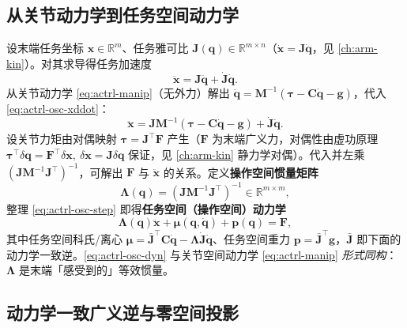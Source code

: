 \subsection{从关节动力学到任务空间动力学}
\label{sec:actrl-osc-deriv}

设末端任务坐标 $\mathbf{x}\in\mathbb{R}^m$、任务雅可比 $\mathbf{J}(\mathbf{q})\in\mathbb{R}^{m\times n}$（$\dot{\mathbf{x}}=\mathbf{J}\dot{\mathbf{q}}$，见 \cref{ch:arm-kin}）。对其求导得任务加速度
\begin{equation}
  \ddot{\mathbf{x}}=\mathbf{J}\ddot{\mathbf{q}}+\dot{\mathbf{J}}\dot{\mathbf{q}}.
  \label{eq:actrl-osc-xddot}
\end{equation}
从关节动力学 \cref{eq:actrl-manip}（无外力）解出 $\ddot{\mathbf{q}}=\mathbf{M}^{-1}(\boldsymbol{\tau}-\mathbf{C}\dot{\mathbf{q}}-\mathbf{g})$，代入 \cref{eq:actrl-osc-xddot}：
\begin{equation}
  \ddot{\mathbf{x}}=\mathbf{J}\mathbf{M}^{-1}(\boldsymbol{\tau}-\mathbf{C}\dot{\mathbf{q}}-\mathbf{g})+\dot{\mathbf{J}}\dot{\mathbf{q}}.
  \label{eq:actrl-osc-step}
\end{equation}
设关节力矩由对偶映射 $\boldsymbol{\tau}=\mathbf{J}^\top\mathbf{F}$ 产生（$\mathbf{F}$ 为末端广义力，对偶性由虚功原理 $\boldsymbol{\tau}^\top\delta\mathbf{q}=\mathbf{F}^\top\delta\mathbf{x},\ \delta\mathbf{x}=\mathbf{J}\delta\mathbf{q}$ 保证，见 \cref{ch:arm-kin} 静力学对偶）。代入并左乘 $(\mathbf{J}\mathbf{M}^{-1}\mathbf{J}^\top)^{-1}$，可解出 $\mathbf{F}$ 与 $\ddot{\mathbf{x}}$ 的关系。定义\textbf{操作空间惯量矩阵}
\begin{equation}
  \boxed{\boldsymbol{\Lambda}(\mathbf{q})=(\mathbf{J}\mathbf{M}^{-1}\mathbf{J}^\top)^{-1}\in\mathbb{R}^{m\times m},}
  \label{eq:actrl-Lambda}
\end{equation}
整理 \cref{eq:actrl-osc-step} 即得\textbf{任务空间（操作空间）动力学}
\begin{equation}
  \boxed{\boldsymbol{\Lambda}(\mathbf{q})\ddot{\mathbf{x}}+\boldsymbol{\mu}(\mathbf{q},\dot{\mathbf{q}})+\mathbf{p}(\mathbf{q})=\mathbf{F},}
  \label{eq:actrl-osc-dyn}
\end{equation}
其中任务空间科氏/离心 $\boldsymbol{\mu}=\bar{\mathbf{J}}^\top\mathbf{C}\dot{\mathbf{q}}-\boldsymbol{\Lambda}\dot{\mathbf{J}}\dot{\mathbf{q}}$、任务空间重力 $\mathbf{p}=\bar{\mathbf{J}}^\top\mathbf{g}$，$\bar{\mathbf{J}}$ 即下面的动力学一致逆。\cref{eq:actrl-osc-dyn} 与关节空间动力学 \cref{eq:actrl-manip} \emph{形式同构}：$\boldsymbol{\Lambda}$ 是末端「感受到的」等效惯量。

\subsection{动力学一致广义逆与零空间投影}
\label{sec:actrl-osc-null}

